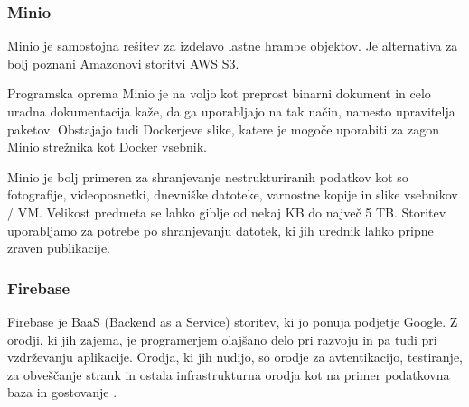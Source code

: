 \documentclass[a4paper, 12pt]{book}
\begin{document}



\subsubsection{Minio}
\label{minio-what}
Minio je samostojna rešitev za izdelavo lastne hrambe objektov. Je alternativa za bolj poznani Amazonovi storitvi AWS S3.

Programska oprema Minio je na voljo kot preprost binarni dokument in celo uradna dokumentacija kaže, da ga uporabljajo na tak način, namesto upravitelja paketov. Obstajajo tudi Dockerjeve slike, katere je mogoče uporabiti za zagon Minio strežnika kot Docker vsebnik.

Minio je bolj primeren za shranjevanje nestrukturiranih podatkov kot so fotografije, videoposnetki, dnevniške datoteke, varnostne kopije in slike vsebnikov / VM. Velikost predmeta se lahko giblje od nekaj KB do največ 5 TB. Storitev uporabljamo za potrebe po shranjevanju datotek, ki jih urednik lahko pripne zraven publikacije.



\subsubsection{Firebase}
Firebase je BaaS (Backend as a Service) storitev, ki jo ponuja podjetje Google. Z orodji, ki jih zajema, je programerjem olajšano delo pri razvoju in pa tudi pri vzdrževanju aplikacije. Orodja, ki jih nudijo, so orodje za avtentikacijo, testiranje, za obveščanje strank in ostala infrastrukturna orodja kot na primer podatkovna baza in gostovanje \cite{firebase-about}.
\end{document}
